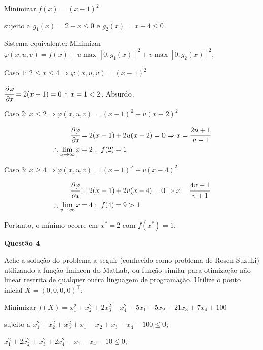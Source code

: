 \documentclass{rbfin}
\begin{document}
Minimizar $f(x) = (x-1)^2$

sujeito a $g_1(x) = 2-x \le 0$ e $g_2(x) = x - 4 \le 0$.

Sistema equivalente: Minimizar $\varphi(x,u,v) = f(x) + u \max[0,g_1(x)]^2 + v \max[0,g_2(x)]^2$. 

Caso $1$: $2 \le x \le 4 \Rightarrow \varphi(x,u,v) = (x-1)^2$

$\cfrac{\partial \varphi}{\partial x} = 2(x - 1) = 0 \therefore x = 1 < 2$. Absurdo.

\newpage

Caso $2$: $x \le 2 \Rightarrow \varphi(x,u,v) = (x-1)^2 + u (x - 2)^2$

\begin{align*}
\cfrac{\partial \varphi}{\partial x} &= 2(x-1) + 2u (x - 2) = 0 \Rightarrow x = \cfrac{2u + 1}{u + 1} \\
\therefore \lim_{u \to \infty} x &= 2\,\,;\,\,f(2) = 1
\end{align*}

Caso $3$: $x \ge 4 \Rightarrow \varphi(x,u,v) = (x-1)^2 + v (x-4)^2$

\begin{align*}
\cfrac{\partial \varphi}{\partial x} &= 2(x-1) + 2v (x - 4) = 0 \Rightarrow x = \cfrac{4v + 1}{v + 1} \\
\therefore \lim_{v \to \infty} x &= 4\,\,;\,\,f(4) = 9 > 1
\end{align*}

Portanto, o mínimo ocorre em $x^* = 2$ com $f(x^*) = 1$.

\singlespacing

\large

\textbf{Questão 4}

\normalsize

\vspace{6mm}

\doublespacing

Ache a solução do problema a seguir (conhecido como problema de Rosen-Suzuki)
utilizando a função fmincon do MatLab, ou função similar para otimização não
linear restrita de qualquer outra linguagem de programação. Utilize o ponto inicial
$X = (0, 0, 0, 0)^\top$:

Minimizar $f(X) = x_1^2 + x_2^2 + 2x_3^2 - x_4^2 - 5x_1 - 5x_2 - 21x_3 + 7x_4 + 100$

sujeito a $x_1^2 + x_2^2 + x_3^2 + x_1 - x_2 + x_3 - x_4 - 100 \le 0$;

$x_1^2 + 2x_2^2 + x_3^2 + 2x_4^2 - x_1 - x_4 - 10 \le 0$;
\end{document}

